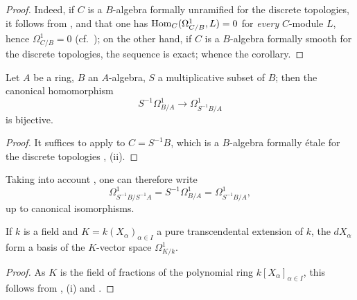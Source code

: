\begin{proof}
Indeed, if $C$ is a $B$-algebra formally unramified for the discrete topologies, it follows from ,  and  that one has $\operatorname{Hom}_C(\Omega^1_{C/B},L)=0$ for \emph{every} $C$-module $L$, hence $\Omega^1_{C/B}=0$ (cf.\ ); on the other hand, if $C$ is a $B$-algebra formally smooth for the discrete topologies, the sequence  is exact; whence the corollary.
\end{proof}

\begin{corollary}[20.5.9]
\label{0.20.5.9}
Let $A$ be a ring, $B$ an $A$-algebra, $S$ a multiplicative subset of $B$; then the canonical homomorphism
\begin{equation}
\tag{20.5.9.1}
  \label{0.20.5.9.1}
  S^{-1}\Omega^1_{B/A}\to\Omega^1_{S^{-1}B/A}
\end{equation}
is bijective.
\end{corollary}

\begin{proof}
It suffices to apply  to $C=S^{-1}B$, which is a $B$-algebra formally \'{e}tale for the discrete topologies , (ii).
\end{proof}

Taking into account , one can therefore write
\begin{equation}
\tag{20.5.9.2}
  \label{0.20.5.9.2}
  \Omega^1_{S^{-1}B/S^{-1}A} = S^{-1}\Omega^1_{B/A} = \Omega^1_{S^{-1}B/A},
\end{equation}
up to canonical isomorphisms.

\begin{corollary}[20.5.10]
\label{0.20.5.10}
If $k$ is a field and $K=k(X_\alpha)_{\alpha\in I}$ a pure transcendental extension of $k$, the $dX_\alpha$ form a basis of the $K$-vector space $\Omega^1_{K/k}$.
\end{corollary}

\begin{proof}
As $K$ is the field of fractions of the polynomial ring $k[X_\alpha]_{\alpha\in I}$, this follows from , (i) and .
\end{proof}

